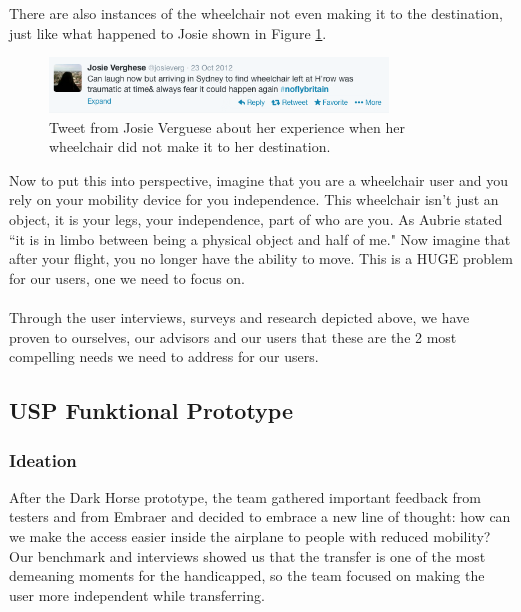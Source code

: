 There are also instances of the wheelchair not even making it to the destination, just like what happened to Josie shown in Figure \ref{fig:leftwheelchair.png}. 

\begin{figure}[h]
  \centering
     \includegraphics[width=9cm]{images/leftwheelchair.png}
   \caption{Tweet from Josie Verguese about her experience when her wheelchair did not make it to her destination.}
  \label{fig:leftwheelchair.png}
\end{figure}

Now to put this into perspective, imagine that you are a wheelchair user and you rely on your mobility device for you independence. This wheelchair isn't just an object, it is your legs, your independence, part of who are you. As Aubrie stated ``it is in limbo between being a physical object and half of me." Now imagine that after your flight, you no longer have the ability to move. This is a HUGE problem for our users, one we need to focus on. \\
\\

 Through  the user interviews, surveys and research depicted above, we have proven to ourselves, our advisors and our users that these are the 2 most compelling needs we need to address for our users. 

\subsection{USP Funktional Prototype}
\subsubsection{Ideation}
After the Dark Horse prototype, the team gathered important feedback from testers and from Embraer and decided to embrace a new line of thought: how can we make the access easier inside the airplane to people with reduced mobility? \\

Our benchmark and interviews showed us that the transfer is one of the most demeaning moments for the handicapped, so the team focused on making the user more independent while transferring. \\

